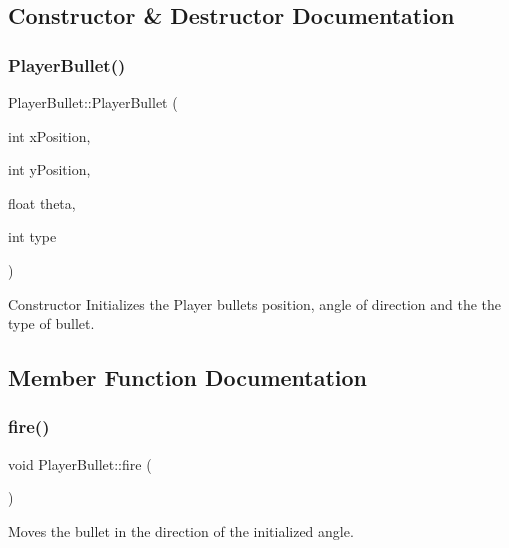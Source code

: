 \subsection{Constructor \& Destructor Documentation}
\mbox{\label{class_player_bullet_ab48e600824aa9c70206810e37f918d52}} 
\subsubsection{\texorpdfstring{Player\+Bullet()}{PlayerBullet()}}
{\footnotesize\ttfamily Player\+Bullet\+::\+Player\+Bullet (\begin{DoxyParamCaption}\item[{int}]{x\+Position,  }\item[{int}]{y\+Position,  }\item[{float}]{theta,  }\item[{int}]{type }\end{DoxyParamCaption})}



Constructor Initializes the Player bullets position, angle of direction and the the type of bullet. 



\subsection{Member Function Documentation}
\mbox{\label{class_player_bullet_a4ef09e533d8d3016d7e08d9efae238ff}} 
\subsubsection{\texorpdfstring{fire()}{fire()}}
{\footnotesize\ttfamily void Player\+Bullet\+::fire (\begin{DoxyParamCaption}{ }\end{DoxyParamCaption})}



Moves the bullet in the direction of the initialized angle. 

